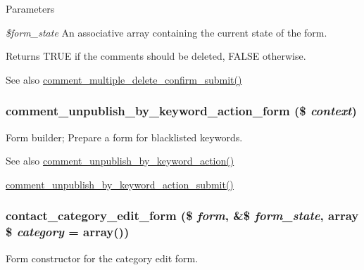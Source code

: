 \begin{DoxyParams}{Parameters}
\item[{\em \$form\_\-state}]An associative array containing the current state of the form. \end{DoxyParams}
\begin{DoxyReturn}{Returns}
TRUE if the comments should be deleted, FALSE otherwise.
\end{DoxyReturn}
\begin{DoxySeeAlso}{See also}
\hyperlink{comment_8admin_8inc_a0995d69b00481eb46c1981112df0999f}{comment\_\-multiple\_\-delete\_\-confirm\_\-submit()} 
\end{DoxySeeAlso}
\hypertarget{group__forms_gad0012e675df965329fce2570a6be8f46}{
\subsubsection[{comment\_\-unpublish\_\-by\_\-keyword\_\-action\_\-form}]{\setlength{\rightskip}{0pt plus 5cm}comment\_\-unpublish\_\-by\_\-keyword\_\-action\_\-form (\$ {\em context})}}
\label{group__forms_gad0012e675df965329fce2570a6be8f46}
Form builder; Prepare a form for blacklisted keywords.

\begin{DoxySeeAlso}{See also}
\hyperlink{group__actions_gaf5c19c791a33e0dc2b0bd3eb4fa79ba5}{comment\_\-unpublish\_\-by\_\-keyword\_\-action()} 

\hyperlink{comment_8module_ad94091cb95aec2dd607bde68a07e0dd1}{comment\_\-unpublish\_\-by\_\-keyword\_\-action\_\-submit()} 
\end{DoxySeeAlso}
\hypertarget{group__forms_ga9283549b12df4a9a6cdb49202ae658ac}{
\subsubsection[{contact\_\-category\_\-edit\_\-form}]{\setlength{\rightskip}{0pt plus 5cm}contact\_\-category\_\-edit\_\-form (\$ {\em form}, \/  \&\$ {\em form\_\-state}, \/  array \$ {\em category} = {\ttfamily array()})}}
\label{group__forms_ga9283549b12df4a9a6cdb49202ae658ac}
Form constructor for the category edit form.


